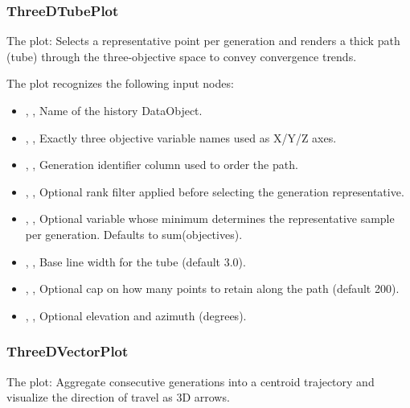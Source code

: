\subsubsection{ThreeDTubePlot}
The   plot: Selects a representative point per generation and renders a thick path (tube) through the three-objective space to convey convergence trends.

The  plot recognizes the following input nodes:
\begin{itemize}
  \item {}, , Name of the history DataObject.
  \item {}, , Exactly three objective variable names used as X/Y/Z axes.
  \item {}, , Generation identifier column used to order the path.
  \item {}, , Optional rank filter applied before selecting the generation representative.
  \item {}, , Optional variable whose minimum determines the representative sample per generation. Defaults to sum(objectives).
  \item {}, , Base line width for the tube (default 3.0).
  \item {}, , Optional cap on how many points to retain along the path (default 200).
  \item {}, , Optional elevation and azimuth (degrees).
\end{itemize}

\subsubsection{ThreeDVectorPlot}
The   plot: Aggregate consecutive generations into a centroid trajectory and visualize the direction of travel as 3D arrows.

